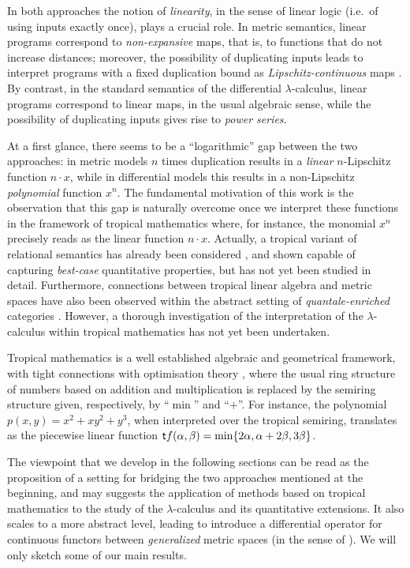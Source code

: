\documentclass[submission,%
]{eptcs}
\begin{document}
In both approaches the notion of \emph{linearity}, in the sense of linear logic \cite{girardLl} (i.e.~of using inputs exactly once), plays a crucial role.
In metric semantics, linear programs correspond to \emph{non-expansive} maps, that is, to functions that do not increase distances; moreover, the possibility of duplicating inputs leads to interpret programs with a fixed duplication bound as \emph{Lipschitz-continuous} maps \cite{Gaboardi2017}.
By contrast, in the standard semantics of the differential $\lambda$-calculus, linear programs correspond to linear maps, in the usual algebraic sense, while the possibility of duplicating inputs gives rise to \emph{power series}.

At a first glance, there seems to be a  ``logarithmic'' gap between the two approaches:
in metric models $n$ times duplication results in a  \emph{linear} $n$-Lipschitz function $n\cdot x$, while in differential models this results in a non-Lipschitz \emph{polynomial} function $x^{n}$.
The fundamental motivation of this work is the observation that 
this gap is naturally overcome once we interpret these functions in the framework of tropical mathematics where, for instance, the monomial $x^{n}$ precisely reads as the linear function $n\cdot x$.
Actually, a tropical variant of relational semantics has already been considered \cite{Manzo2013}, and shown capable of capturing \emph{best-case} quantitative properties, but has not yet been studied in detail. Furthermore, connections between tropical linear algebra and metric spaces have also been observed \cite{Fuji} within the abstract setting of \emph{quantale-enriched} categories \cite{Hofmann2014, Stubbe2014}.
However, a thorough investigation of the interpretation of the $\lambda$-calculus within tropical mathematics has not yet been undertaken. 

Tropical mathematics \cite{Simon} is a well established algebraic and geometrical framework, with tight connections with optimisation theory \cite{Sturmfelds}, where the usual ring structure of numbers based on addition and multiplication is replaced by the semiring structure given, respectively, by ``$\min$'' and ``$+$''.
For instance, the polynomial $p(x,y)=x^{2}+xy^{2}+y^{3}$, when interpreted over the tropical semiring, translates as the piecewise linear function
$
\mathsf{t} f(\alpha,\beta)=\min\{2\alpha, \alpha+2\beta, 3\beta\}
$.

The viewpoint that we develop in the following sections can be read as the proposition of a setting for bridging the two approaches mentioned at the beginning, and may suggests the application of methods based on tropical mathematics to the study of the $\lambda$-calculus and its quantitative extensions.
It also scales to a 
more abstract level, leading to introduce a 
differential operator for continuous functors between \emph{generalized} metric spaces (in the sense of \cite{Lawvere1973}).
We will only sketch some of our main results.%
\end{document}
